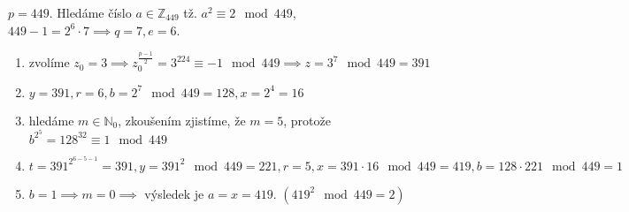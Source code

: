 \documentclass[12pt, a4paper]{article}
\begin{document}
$p = 449$. Hledáme číslo $a \in \mathbb{Z}_{449}$ tž. $a^2 \equiv 2 \mod{449}$, $449-1 = 2^6 \cdot 7 \implies q = 7, e = 6$.
\begin{enumerate}
\item zvolíme $z_0 = 3 \implies z_0^{\frac{p-1}{2}} = 3^{224} \equiv -1  \mod{449} \implies z = 3^7 \mod{449} = 391$
\item $y = 391, r = 6, b = 2^7 \mod{449} = 128, x = 2^4 = 16$
\item hledáme $m \in \mathbb{N}_0$, zkoušením zjistíme, že $m = 5$, protože $b^{2^5} = 128^{32} \equiv 1 \mod{449}$
\item $t = 391^{2^{6-5-1}} = 391, y = 391^2 \mod{449} = 221, r=5, x = 391\cdot 16 \mod{449} = 419, b = 128\cdot 221 \mod{449} = 1$
\item $b = 1 \implies m = 0 \implies$ výsledek je $a = x=419$. $(419^2 \mod{449} = 2)$
\end{enumerate}
\end{document}
